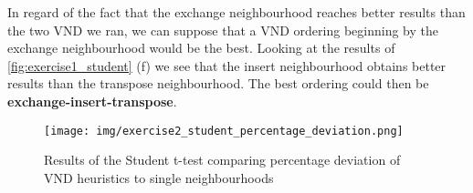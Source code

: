 \documentclass[a4paper,10pt]{article}
\begin{document}
In regard of the fact that the exchange neighbourhood reaches better results than the two VND we ran, we can suppose that a VND ordering beginning by the exchange neighbourhood would be the best. Looking at the results of \ref{fig:exercise1_student} (f) we see that the insert neighbourhood obtains better results than the transpose neighbourhood. The best ordering could then be \textbf{exchange-insert-transpose}.

\begin{figure}[H]
	\centering
	\caption{Results of the Student t-test comparing percentage deviation of VND heuristics to single neighbourhoods}
	\texttt{[image: img/exercise2\_student\_percentage\_deviation.png]}
\end{figure}
\end{document}
